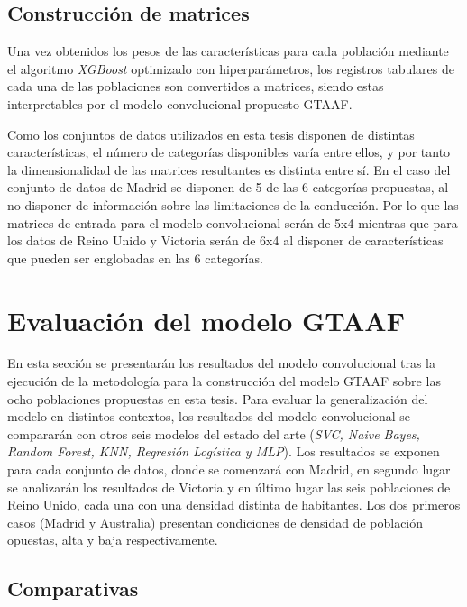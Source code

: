 \subsection{Construcción de matrices}

Una vez obtenidos los pesos de las características para cada población mediante el algoritmo \textit{XGBoost} optimizado con hiperparámetros, los registros tabulares de cada una de las poblaciones son convertidos a matrices, siendo estas interpretables por el modelo convolucional propuesto GTAAF.

Como los conjuntos de datos utilizados en esta tesis disponen de distintas características, el número de categorías disponibles varía entre ellos, y por tanto la dimensionalidad de las matrices resultantes es distinta entre sí. En el caso del conjunto de datos de Madrid se disponen de 5 de las 6 categorías propuestas, al no disponer de información sobre las limitaciones de la conducción. Por lo que las matrices de entrada para el modelo convolucional serán de 5x4 mientras que para los datos de Reino Unido y Victoria serán de 6x4 al disponer de características que pueden ser englobadas en las 6 categorías. 


\section{Evaluación del modelo GTAAF}

En esta sección se presentarán los resultados del modelo convolucional tras la ejecución de la metodología para la construcción del modelo GTAAF sobre las ocho poblaciones propuestas en esta tesis. Para evaluar la generalización del modelo en distintos contextos, los resultados del modelo convolucional se compararán con otros seis modelos del estado del arte (\textit{SVC, Naive Bayes, Random Forest, KNN, Regresión Logística y MLP}). Los resultados se exponen para cada conjunto de datos, donde se comenzará con Madrid, en segundo lugar se analizarán los resultados de Victoria y en último lugar las seis poblaciones de Reino Unido, cada una con una densidad distinta de habitantes. Los dos primeros casos (Madrid y Australia) presentan condiciones de densidad de población opuestas, alta y baja respectivamente.

\subsection{Comparativas}
